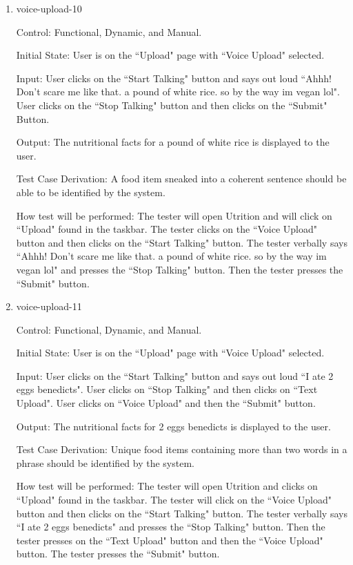 \documentclass[12pt, titlepage]{article}
\begin{document}
\begin{enumerate}
	\item{voice-upload-10\\}
	
	Control: Functional, Dynamic, and Manual.
	
	Initial State: User is on the ``Upload" page with ``Voice Upload" selected.
	
	Input: User clicks on the ``Start Talking" button and says out loud ``Ahhh! Don't scare me like that. a pound of white rice. so by the way im vegan lol". User clicks on the ``Stop Talking" button and then clicks on the ``Submit" Button.
	
	Output: The nutritional facts for a pound of white rice is displayed to the user.
	
	Test Case Derivation: A food item sneaked into a coherent sentence should be able to be identified by the system. 
	
	How test will be performed: The tester will open Utrition and will click on ``Upload" found in the taskbar. The tester clicks on the ``Voice Upload" button and then clicks on the ``Start Talking" button. The tester verbally says ``Ahhh! Don't scare me like that. a pound of white rice. so by the way im vegan lol" and presses the ``Stop Talking" button. Then the tester presses the ``Submit" button.
	
	\item{voice-upload-11\\}
	
	Control: Functional, Dynamic, and Manual.
	
	Initial State: User is on the ``Upload" page with ``Voice Upload" selected.
	
	Input: User clicks on the ``Start Talking" button and says out loud ``I ate 2 eggs benedicts". User clicks on ``Stop Talking" and then clicks on ``Text Upload". User clicks on ``Voice Upload" and then the ``Submit" button.
	
	Output: The nutritional facts for 2 eggs benedicts is displayed to the user.
	
	Test Case Derivation: Unique food items containing more than two words in a phrase should be identified by the system.
	
	How test will be performed: The tester will open Utrition and clicks on ``Upload" found in the taskbar. The tester will click on the ``Voice Upload" button and then clicks on the ``Start Talking" button. The tester verbally says ``I ate 2 eggs benedicts" and presses the ``Stop Talking" button. Then the tester presses on the ``Text Upload" button and then the ``Voice Upload" button. The tester presses the ``Submit" button.
	

\end{enumerate}
\end{document}

